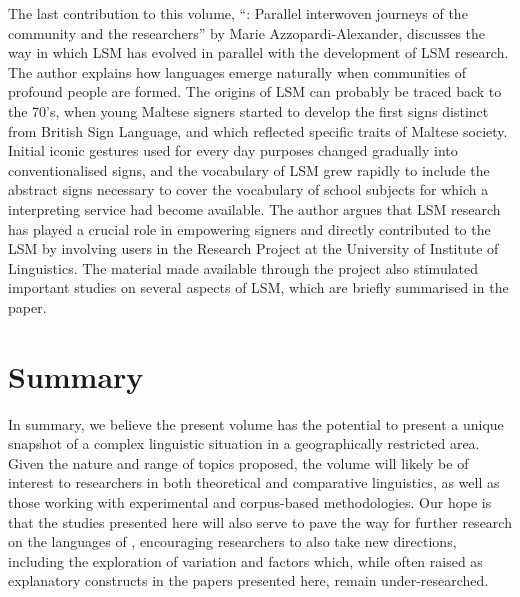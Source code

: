\documentclass[output=paper]{LSP/langsci}
\begin{document}
The last contribution to this volume, ``:
Parallel interwoven journeys of the  community and the
researchers'' by Marie Azzopardi-Alexander, discusses the way in which
LSM has evolved in parallel with the
development of LSM research. The author explains how  languages
emerge naturally when communities of profound  people are
formed. The origins of LSM can probably be traced back to the 70's,
when young Maltese signers started to develop the first signs distinct
from British Sign Language, and which reflected specific traits of Maltese
society. Initial iconic gestures used for every day purposes changed
gradually into conventionalised signs, and the vocabulary of LSM grew
rapidly to include the abstract signs necessary to cover
the vocabulary of school subjects for which a  interpreting
service had become available. The author argues that LSM research has
played a crucial role in empowering  signers and directly
contributed to the LSM  by involving  users in
the  Research Project at the University of 
Institute of Linguistics. The material made available through the
project also stimulated important studies on several aspects of LSM,
which are briefly summarised in the paper.

\section{Summary}
In summary, we believe the present volume has the potential to present
a unique snapshot of a complex linguistic situation in a
geographically restricted area. Given the nature and range of topics
proposed, the volume will likely be of interest to researchers in both
theoretical and comparative linguistics, as well as those working with
 experimental and corpus-based methodologies. Our hope is that the 
studies presented here will also serve to pave the way for further research
on the languages of , encouraging researchers to also take new directions, including
the exploration of variation and  factors which, while often raised as 
explanatory constructs in the papers presented here, remain under-researched.
\end{document}
